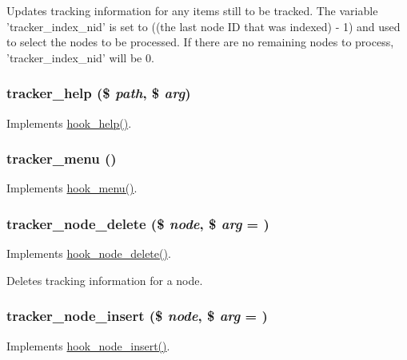 Updates tracking information for any items still to be tracked. The variable 'tracker\_\-index\_\-nid' is set to ((the last node ID that was indexed) -\/ 1) and used to select the nodes to be processed. If there are no remaining nodes to process, 'tracker\_\-index\_\-nid' will be 0. \hypertarget{tracker_8module_a34ce08561a0ee7c41d382a89c9ad351d}{
\subsubsection[{tracker\_\-help}]{\setlength{\rightskip}{0pt plus 5cm}tracker\_\-help (\$ {\em path}, \/  \$ {\em arg})}}
\label{tracker_8module_a34ce08561a0ee7c41d382a89c9ad351d}
Implements \hyperlink{group__hooks_ga5589c2714a782738e8851c4c90231f0e}{hook\_\-help()}. \hypertarget{tracker_8module_a9f1821155039eab4ea1f8e4893113c75}{
\subsubsection[{tracker\_\-menu}]{\setlength{\rightskip}{0pt plus 5cm}tracker\_\-menu ()}}
\label{tracker_8module_a9f1821155039eab4ea1f8e4893113c75}
Implements \hyperlink{group__hooks_ga5c95244fea59b25666e409759e133ded}{hook\_\-menu()}. \hypertarget{tracker_8module_a2b027e86cbf4a3b871485ba3166f54c0}{
\subsubsection[{tracker\_\-node\_\-delete}]{\setlength{\rightskip}{0pt plus 5cm}tracker\_\-node\_\-delete (\$ {\em node}, \/  \$ {\em arg} = {})}}
\label{tracker_8module_a2b027e86cbf4a3b871485ba3166f54c0}
Implements \hyperlink{group__node__api__hooks_ga66ea0473a9950dc961802e801e5042e9}{hook\_\-node\_\-delete()}.

Deletes tracking information for a node. \hypertarget{tracker_8module_ac8a528a31cb636901922ff27ae512a73}{
\subsubsection[{tracker\_\-node\_\-insert}]{\setlength{\rightskip}{0pt plus 5cm}tracker\_\-node\_\-insert (\$ {\em node}, \/  \$ {\em arg} = {})}}
\label{tracker_8module_ac8a528a31cb636901922ff27ae512a73}
Implements \hyperlink{group__node__api__hooks_ga8b40dc62e46e5055c205d2a723dc3548}{hook\_\-node\_\-insert()}.


